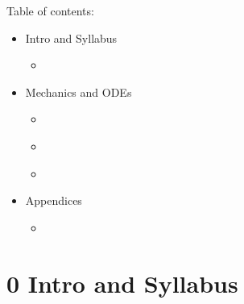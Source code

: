 \documentclass[letterpaper,10pt,english]{jupyterBook}
\begin{document}
\sphinxAtStartPar
Table of contents:
\begin{itemize}
\item {} 
 \sphinxhyphen{} Intro and Syllabus

\begin{itemize}
\item {} 
\sphinxAtStartPar
{\hyperref[\detokenize{content/0_course/0_syllabus::doc}]{}}

\end{itemize}
\end{itemize}
\begin{itemize}
\item {} 
 \sphinxhyphen{} Mechanics and ODEs

\begin{itemize}
\item {} 
\sphinxAtStartPar
{\hyperref[\detokenize{content/1_mechanics/modeling/what_is_modeling::doc}]{}}

\item {} 
\sphinxAtStartPar
{\hyperref[\detokenize{content/1_mechanics/modeling/activity-what_is_a_model::doc}]{}}

\item {} 
\sphinxAtStartPar
{\hyperref[\detokenize{content/1_mechanics/sho/notes-SHO::doc}]{}}

\end{itemize}
\end{itemize}
\begin{itemize}
\item {} 
\sphinxAtStartPar
Appendices

\begin{itemize}
\item {} 
\sphinxAtStartPar
{\hyperref[\detokenize{content/references::doc}]{}}

\end{itemize}
\end{itemize}

\sphinxstepscope


\part{0 \sphinxhyphen{} Intro and Syllabus}
\end{document}
